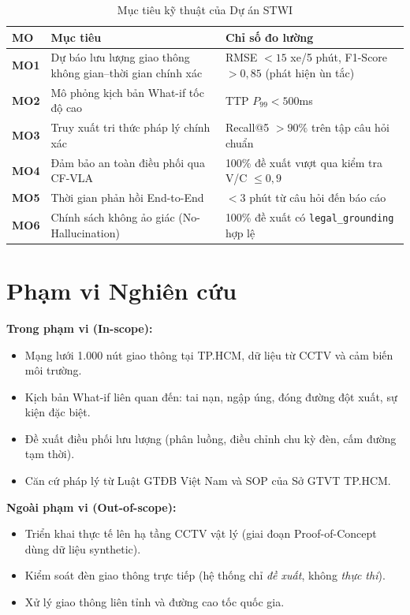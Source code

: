 \begin{table}[H]
\centering
\caption{Mục tiêu kỹ thuật của Dự án STWI}
\label{tab:objectives}
\renewcommand{\arraystretch}{1.4}
\begin{tabular}{>{\bfseries}p{0.8cm} p{5.5cm} p{5.5cm}}
\toprule
\textbf{MO} & \textbf{Mục tiêu} & \textbf{Chỉ số đo lường} \\
\midrule
MO1 & Dự báo lưu lượng giao thông không gian--thời gian chính xác & RMSE $< 15$ xe/5 phút, F1-Score $> 0{,}85$ (phát hiện ùn tắc) \\
\rowcolor{rowgray}
MO2 & Mô phỏng kịch bản What-if tốc độ cao & TTP $P_{99} < 500$ms \\
MO3 & Truy xuất tri thức pháp lý chính xác & Recall@5 $> 90\%$ trên tập câu hỏi chuẩn \\
\rowcolor{rowgray}
MO4 & Đảm bảo an toàn điều phối qua CF-VLA & 100\% đề xuất vượt qua kiểm tra V/C $\leq 0{,}9$ \\
MO5 & Thời gian phản hồi End-to-End & $< 3$ phút từ câu hỏi đến báo cáo \\
\rowcolor{rowgray}
MO6 & Chính sách không ảo giác (No-Hallucination) & 100\% đề xuất có \texttt{legal\_grounding} hợp lệ \\
\bottomrule
\end{tabular}
\end{table}

\section{Phạm vi Nghiên cứu}

\textbf{Trong phạm vi (In-scope):}
\begin{itemize}[leftmargin=1.5cm, itemsep=3pt]
  \item Mạng lưới 1.000 nút giao thông tại TP.HCM, dữ liệu từ CCTV và cảm biến môi trường.
  \item Kịch bản What-if liên quan đến: tai nạn, ngập úng, đóng đường đột xuất, sự kiện đặc biệt.
  \item Đề xuất điều phối lưu lượng (phân luồng, điều chỉnh chu kỳ đèn, cấm đường tạm thời).
  \item Căn cứ pháp lý từ Luật GTĐB Việt Nam và SOP của Sở GTVT TP.HCM.
\end{itemize}

\textbf{Ngoài phạm vi (Out-of-scope):}
\begin{itemize}[leftmargin=1.5cm, itemsep=3pt]
  \item Triển khai thực tế lên hạ tầng CCTV vật lý (giai đoạn Proof-of-Concept dùng dữ liệu synthetic).
  \item Kiểm soát đèn giao thông trực tiếp (hệ thống chỉ \textit{đề xuất}, không \textit{thực thi}).
  \item Xử lý giao thông liên tỉnh và đường cao tốc quốc gia.
\end{itemize}

